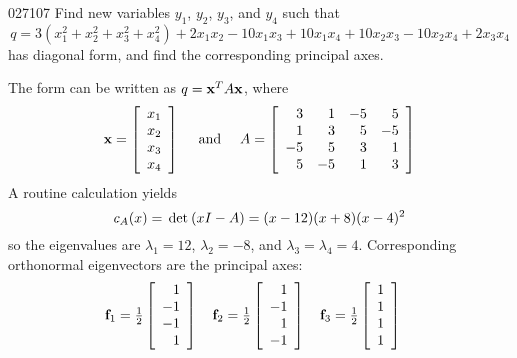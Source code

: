 \begin{example}{}{027107}
Find new variables $y_{1}$, $y_{2}$, $y_{3}$, and $y_{4}$ such that
\begin{equation*}
q = 3(x_{1}^2 + x_{2}^2 + x_{3}^2 +x_{4}^2) + 2x_{1}x_{2} - 10x_{1}x_{3} + 10x_{1}x_{4} + 10x_{2}x_{3} - 10x_{2}x_{4} + 2x_{3}x_{4}
\end{equation*}
has diagonal form, and find the corresponding principal axes.


\begin{solution}
  The form can be written as $q = \textbf{x}^{T}A\textbf{x}$, where
\begin{equation*}
\textbf{x} = \left[ \begin{array}{c}
x_{1} \\
x_{2} \\
x_{3} \\
x_{4}
\end{array}\right] \quad \mbox{ and } \quad 
A = \left[ \begin{array}{rrrr}
3 & 1 & -5 & 5 \\
1 & 3 & 5 & -5 \\
-5 & 5 & 3 & 1 \\
5 & -5 & 1 & 3
\end{array}\right]
\end{equation*}
A routine calculation yields
\begin{equation*}
c_{A}(x) = \thinspace\operatorname{det\medspace}(xI - A) = (x - 12)(x + 8)(x - 4)^2
\end{equation*}
so the eigenvalues are $\lambda_{1} = 12$, $\lambda_{2} = -8$, and $\lambda_{3} = \lambda_{4} = 4$. Corresponding orthonormal eigenvectors are the principal axes:
\begin{equation*}
\vect{f}_{1} = \frac{1}{2} \leftB \begin{array}{r}
1 \\
-1 \\
-1 \\
1
\end{array}\rightB \quad
\vect{f}_{2} = \frac{1}{2} \leftB \begin{array}{r}
1 \\
-1 \\
1 \\
-1
\end{array}\rightB \quad
\vect{f}_{3} = \frac{1}{2} \leftB \begin{array}{r}
1 \\
1 \\
1 \\
1
\end{array}\rightB \quad

\end{equation*}
\end{solution}
\end{example}

